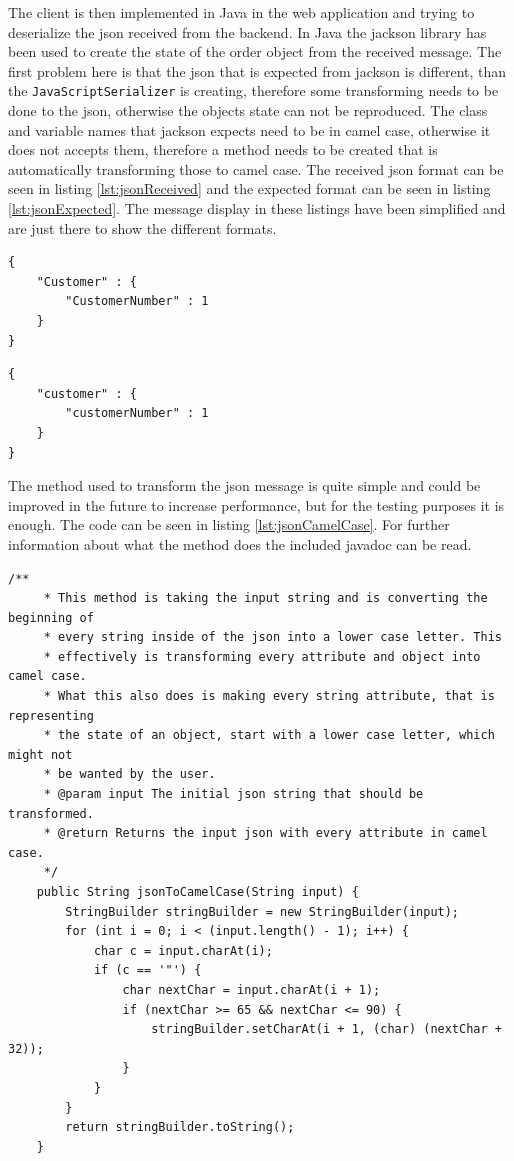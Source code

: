 The client is then implemented in Java in the web application and trying to \gls{deserialize} the \gls{json} received from the backend. In Java the jackson library has been used to create the state of the order object from the received message. \citep{website:jackson} The first problem here is that the \gls{json} that is expected from jackson is different, than the \texttt{JavaScriptSerializer} is creating, therefore some transforming needs to be done to the \gls{json}, otherwise the objects state can not be reproduced. The class and variable names that jackson expects need to be in camel case, otherwise it does not accepts them, therefore a method needs to be created that is automatically transforming those to camel case. The received \gls{json} format can be seen in listing \ref{lst:jsonReceived} and the expected format can be seen in listing \ref{lst:jsonExpected}. The message display in these listings have been simplified and are just there to show the different formats.

\begin{lstlisting}[frame=single, caption=Received JSON format, label=lst:jsonReceived]
{
	"Customer" : {
		"CustomerNumber" : 1	
	}
}
\end{lstlisting}

\begin{lstlisting}[frame=single, caption=Expected JSON format, label=lst:jsonExpected]
{
	"customer" : {
		"customerNumber" : 1	
	}
}
\end{lstlisting}

The method used to transform the \gls{json} message is quite simple and could be improved in the future to increase performance, but for the testing purposes it is enough. The code can be seen in listing \ref{lst:jsonCamelCase}. For further information about what the method does the included javadoc can be read.

\lstset{language=Java}
\begin{lstlisting}[frame=single, caption=Java Code to Transform JSON, label=lst:jsonCamelCase]
    /**
     * This method is taking the input string and is converting the beginning of
     * every string inside of the json into a lower case letter. This 
     * effectively is transforming every attribute and object into camel case.
     * What this also does is making every string attribute, that is representing
     * the state of an object, start with a lower case letter, which might not
     * be wanted by the user.
     * @param input The initial json string that should be transformed.
     * @return Returns the input json with every attribute in camel case.
     */
    public String jsonToCamelCase(String input) {
        StringBuilder stringBuilder = new StringBuilder(input);
        for (int i = 0; i < (input.length() - 1); i++) {
            char c = input.charAt(i);
            if (c == '"') {
                char nextChar = input.charAt(i + 1);
                if (nextChar >= 65 && nextChar <= 90) {
                    stringBuilder.setCharAt(i + 1, (char) (nextChar + 32));
                }
            }
        }
        return stringBuilder.toString();
    }
\end{lstlisting}

